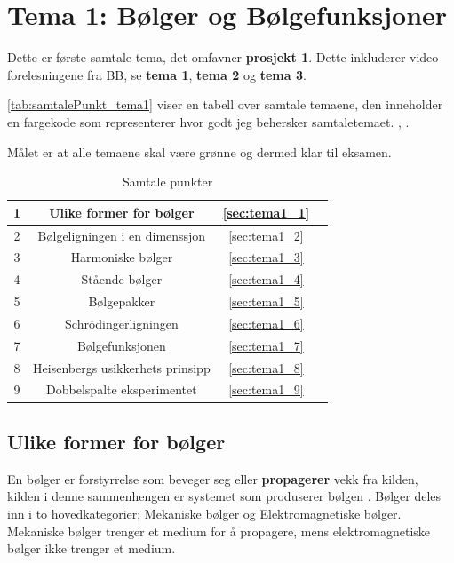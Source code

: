 \section{Tema 1: Bølger og Bølgefunksjoner}
\label{tema1}
Dette er første samtale tema, det omfavner \textbf{prosjekt 1}. Dette inkluderer video forelesningene fra BB, se \textbf{tema 1}, \textbf{tema 2} og \textbf{tema 3}.

\autoref{tab:samtalePunkt_tema1} viser en tabell over samtale temaene, den inneholder en fargekode som representerer hvor godt jeg behersker samtaletemaet. \color{red}{Dårlig}, \color{blue}{ok, men ikke stabil} \color{black}{og} \color{teal}{Jeg er klar for eksamen}.

\color{black}
Målet er at alle temaene skal være grønne og dermed klar til eksamen.

\begin{table}[!htb]
    \centering
    \caption{Samtale punkter}
    \begin{tabular}{|c|c|c|r|}
      \hline
      1 & Ulike former for bølger &  \autoref{sec:tema1_1} & \cellcolor{blue}\quad\quad \\
      \hline 
      2 & Bølgeligningen i en dimenssjon & \autoref{sec:tema1_2} & \cellcolor{blue} \\
      \hline
      3 & Harmoniske bølger & \autoref{sec:tema1_3} & \cellcolor{blue} \\
      \hline
      4 & Stående bølger & \autoref{sec:tema1_4} & \cellcolor{green} \\
      \hline 
      5 & Bølgepakker & \autoref{sec:tema1_5} & \cellcolor{blue} \\
      \hline
      6 & Schrödingerligningen & \autoref{sec:tema1_6} & \cellcolor{green} \\ 
      \hline
      7 & Bølgefunksjonen & \autoref{sec:tema1_7} & \cellcolor{blue} \\
      \hline
      8 & Heisenbergs usikkerhets prinsipp & \autoref{sec:tema1_8} & \cellcolor{green} \\
      \hline
      9 & Dobbelspalte eksperimentet & \autoref{sec:tema1_9} & \cellcolor{green} \\
      \hline
    \end{tabular}
    \label{tab:samtalePunkt_tema1}
\end{table}

\subsection{Ulike former for bølger}
\label{sec:tema1_1}
En bølger er forstyrrelse som beveger seg eller \textbf{propagerer} vekk fra kilden, kilden i denne sammenhengen er systemet som produserer bølgen \cite{waves}. Bølger deles inn i to hovedkategorier; Mekaniske bølger og Elektromagnetiske bølger. Mekaniske bølger trenger et medium for å propagere, mens elektromagnetiske bølger ikke trenger et medium.


